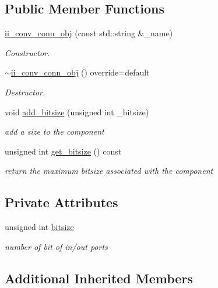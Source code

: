 \subsection*{Public Member Functions}
\begin{DoxyCompactItemize}
\item 
\hyperlink{classii__conv__conn__obj_ac5a113e9ee4a526b242a2b2c452ecbe3}{ii\+\_\+conv\+\_\+conn\+\_\+obj} (const std\+::string \&\+\_\+name)
\begin{DoxyCompactList}\small\item\em Constructor. \end{DoxyCompactList}\item 
\hyperlink{classii__conv__conn__obj_a988ebba9cdae4f2bea8dbf3cdd054692}{$\sim$ii\+\_\+conv\+\_\+conn\+\_\+obj} () override=default
\begin{DoxyCompactList}\small\item\em Destructor. \end{DoxyCompactList}\item 
void \hyperlink{classii__conv__conn__obj_ac0871f08256e3e77c02f78c2b0eafd32}{add\+\_\+bitsize} (unsigned int \+\_\+bitsize)
\begin{DoxyCompactList}\small\item\em add a size to the component \end{DoxyCompactList}\item 
unsigned int \hyperlink{classii__conv__conn__obj_a5fe391a450049808b437da46c463b3e2}{get\+\_\+bitsize} () const
\begin{DoxyCompactList}\small\item\em return the maximum bitsize associated with the component \end{DoxyCompactList}\end{DoxyCompactItemize}
\subsection*{Private Attributes}
\begin{DoxyCompactItemize}
\item 
unsigned int \hyperlink{classii__conv__conn__obj_a48982d5e5043394e2ac8c61a4db5d01f}{bitsize}
\begin{DoxyCompactList}\small\item\em number of bit of in/out ports \end{DoxyCompactList}\end{DoxyCompactItemize}
\subsection*{Additional Inherited Members}


